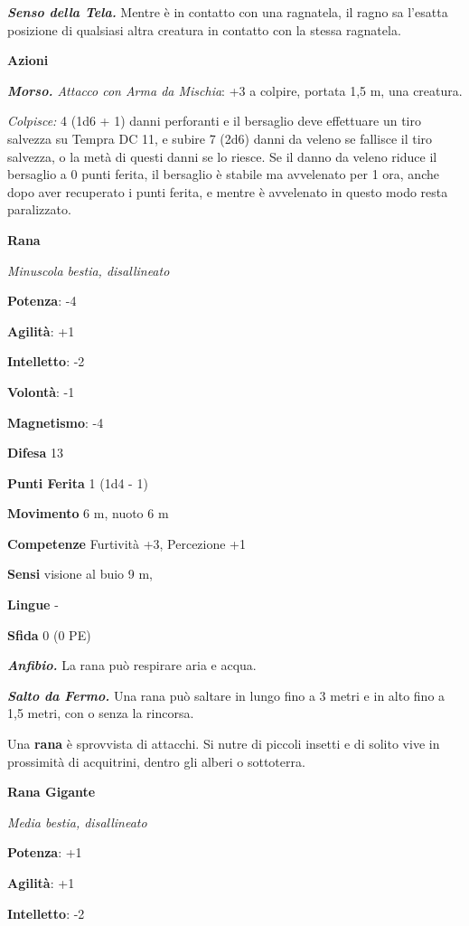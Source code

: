 \begin{multicols}{2}
\emph{\textbf{Senso della Tela.}} Mentre è in contatto con una
ragnatela, il ragno sa l'esatta posizione di qualsiasi altra creatura in
contatto con la stessa ragnatela.

\textbf{Azioni}

\emph{\textbf{Morso.} Attacco con Arma da Mischia}: +3 a colpire,
portata 1,5 m, una creatura.

\emph{Colpisce:} 4 (1d6 + 1) danni perforanti e il bersaglio deve
effettuare un tiro salvezza su Tempra DC 11, e subire 7 (2d6)
danni da veleno se fallisce il tiro salvezza, o la metà di questi danni
se lo riesce. Se il danno da veleno riduce il bersaglio a 0 punti
ferita, il bersaglio è stabile ma avvelenato per 1 ora, anche dopo aver
recuperato i punti ferita, e mentre è avvelenato in questo modo resta
paralizzato.

\textbf{Rana}

\emph{Minuscola bestia, disallineato}

\textbf{Potenza}: -4

\textbf{Agilità}: +1

\textbf{Intelletto}: -2

\textbf{Volontà}: -1

\textbf{Magnetismo}: -4

\textbf{Difesa} 13

\textbf{Punti Ferita} 1 (1d4 - 1)

\textbf{Movimento} 6 m, nuoto 6 m

\textbf{Competenze} Furtività +3, Percezione +1

\textbf{Sensi} visione al buio 9 m, 

\textbf{Lingue} -

\textbf{Sfida} 0 (0 PE)

\emph{\textbf{Anfibio.}} La rana può respirare aria e acqua.

\emph{\textbf{Salto da Fermo.}} Una rana può saltare in lungo fino a 3
metri e in alto fino a 1,5 metri, con o senza la rincorsa.

Una \textbf{rana} è sprovvista di attacchi. Si nutre di piccoli insetti
e di solito vive in prossimità di acquitrini, dentro gli alberi o
sottoterra.

\textbf{Rana Gigante}

\emph{Media bestia, disallineato}

\textbf{Potenza}: +1

\textbf{Agilità}: +1

\textbf{Intelletto}: -2


\end{multicols}
